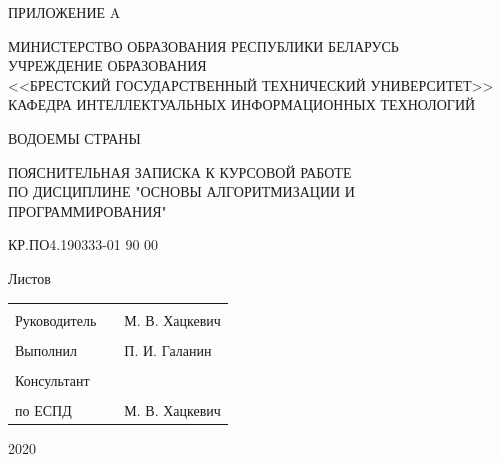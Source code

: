 \documentclass[12pt, a4paper]{article}
\begin{document}
\begin{titlepage}

    \begin{flushright}
        ПРИЛОЖЕНИЕ A
    \end{flushright}

    \vfill

    \begin{center}
        МИНИСТЕРСТВО ОБРАЗОВАНИЯ РЕСПУБЛИКИ БЕЛАРУСЬ\\
        УЧРЕЖДЕНИЕ ОБРАЗОВАНИЯ\\
        <<БРЕСТСКИЙ ГОСУДАРСТВЕННЫЙ ТЕХНИЧЕСКИЙ УНИВЕРСИТЕТ>>\\
        КАФЕДРА ИНТЕЛЛЕКТУАЛЬНЫХ ИНФОРМАЦИОННЫХ ТЕХНОЛОГИЙ\\
    \end{center}

    \vfill

    \begin{center}
        ВОДОЕМЫ СТРАНЫ
    \end{center}

    \vfill

    \begin{center}
        ПОЯСНИТЕЛЬНАЯ ЗАПИСКА К КУРСОВОЙ РАБОТЕ\\
        ПО ДИСЦИПЛИНЕ "ОСНОВЫ АЛГОРИТМИЗАЦИИ И ПРОГРАММИРОВАНИЯ"\\
    \end{center}

    \vfill

    \begin{center}
    КР.ПО4.190333-01 90 00
    \end{center}

    \vfill

    \begin{center}
    Листов \pageref{link:lastPage}
    \end{center}

    \vfill

    \begin{tabular}{ p{5cm} p{5cm} p{5cm}  }
        \multicolumn{3}{c}{}\\
        Руководитель & & М. В. Хацкевич\\
        &&\\
        Выполнил & & П. И. Галанин\\
        &&\\
        Консультант & & \\
        &&\\
        по ЕСПД & & М. В. Хацкевич\\
    \end{tabular}
        
    \vfill

    \begin{center}
        2020
    \end{center}
\end{titlepage}
\newpage
\end{document}
